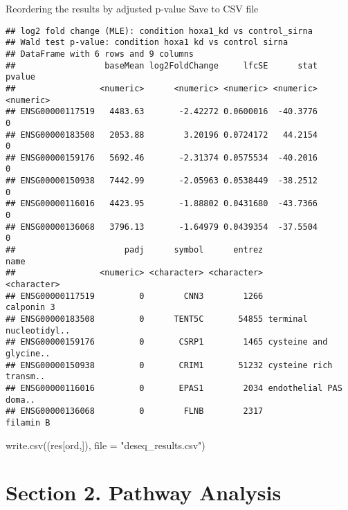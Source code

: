 \documentclass[
]{article}
\newenvironment{Shaded}{\begin{snugshade}}{\end{snugshade}}
\newcommand{\AttributeTok}[1]{\textcolor[rgb]{0.77,0.63,0.00}{#1}}
\newcommand{\FunctionTok}[1]{\textcolor[rgb]{0.00,0.00,0.00}{#1}}
\newcommand{\NormalTok}[1]{#1}
\newcommand{\OtherTok}[1]{\textcolor[rgb]{0.56,0.35,0.01}{#1}}
\newcommand{\SpecialCharTok}[1]{\textcolor[rgb]{0.00,0.00,0.00}{#1}}
\newcommand{\StringTok}[1]{\textcolor[rgb]{0.31,0.60,0.02}{#1}}
\begin{document}
Reordering the results by adjusted p-value Save to CSV file

\begin{Shaded}
\end{Shaded}

\begin{verbatim}
## log2 fold change (MLE): condition hoxa1_kd vs control_sirna 
## Wald test p-value: condition hoxa1 kd vs control sirna 
## DataFrame with 6 rows and 9 columns
##                  baseMean log2FoldChange     lfcSE      stat    pvalue
##                 <numeric>      <numeric> <numeric> <numeric> <numeric>
## ENSG00000117519   4483.63       -2.42272 0.0600016  -40.3776         0
## ENSG00000183508   2053.88        3.20196 0.0724172   44.2154         0
## ENSG00000159176   5692.46       -2.31374 0.0575534  -40.2016         0
## ENSG00000150938   7442.99       -2.05963 0.0538449  -38.2512         0
## ENSG00000116016   4423.95       -1.88802 0.0431680  -43.7366         0
## ENSG00000136068   3796.13       -1.64979 0.0439354  -37.5504         0
##                      padj      symbol      entrez                   name
##                 <numeric> <character> <character>            <character>
## ENSG00000117519         0        CNN3        1266             calponin 3
## ENSG00000183508         0      TENT5C       54855 terminal nucleotidyl..
## ENSG00000159176         0       CSRP1        1465 cysteine and glycine..
## ENSG00000150938         0       CRIM1       51232 cysteine rich transm..
## ENSG00000116016         0       EPAS1        2034 endothelial PAS doma..
## ENSG00000136068         0        FLNB        2317              filamin B
\end{verbatim}

\begin{Shaded}
\begin{Highlighting}[]
\FunctionTok{write.csv}\NormalTok{((res[ord,]), }\AttributeTok{file =} \StringTok{"deseq\_results.csv"}\NormalTok{)}
\end{Highlighting}
\end{Shaded}

\hypertarget{section-2.-pathway-analysis}{%
\section{Section 2. Pathway
Analysis}\label{section-2.-pathway-analysis}}
\end{document}
